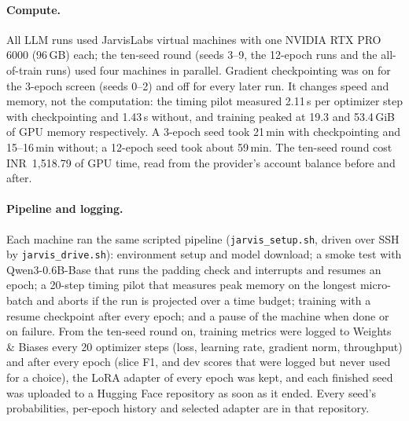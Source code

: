 \paragraph{Compute.}
All LLM runs used JarvisLabs virtual machines with one NVIDIA RTX PRO 6000 (96\,GB) each; the ten-seed round (seeds 3--9, the 12-epoch runs and the all-of-train runs) used four machines in parallel.
Gradient checkpointing was on for the 3-epoch screen (seeds 0--2) and off for every later run.
It changes speed and memory, not the computation: the timing pilot measured 2.11\,s per optimizer step with checkpointing and 1.43\,s without, and training peaked at 19.3 and 53.4\,GiB of GPU memory respectively.
A 3-epoch seed took 21\,min with checkpointing and 15--16\,min without; a 12-epoch seed took about 59\,min.
The ten-seed round cost INR~1,518.79 of GPU time, read from the provider's account balance before and after.

\paragraph{Pipeline and logging.}
Each machine ran the same scripted pipeline (\texttt{jarvis\_setup.sh}, driven over SSH by \texttt{jarvis\_drive.sh}): environment setup and model download; a smoke test with Qwen3-0.6B-Base that runs the padding check and interrupts and resumes an epoch; a 20-step timing pilot that measures peak memory on the longest micro-batch and aborts if the run is projected over a time budget; training with a resume checkpoint after every epoch; and a pause of the machine when done or on failure.
From the ten-seed round on, training metrics were logged to Weights \& Biases every 20 optimizer steps (loss, learning rate, gradient norm, throughput) and after every epoch (slice F1, and dev scores that were logged but never used for a choice), the LoRA adapter of every epoch was kept, and each finished seed was uploaded to a Hugging Face repository as soon as it ended.
Every seed's probabilities, per-epoch history and selected adapter are in that repository.
